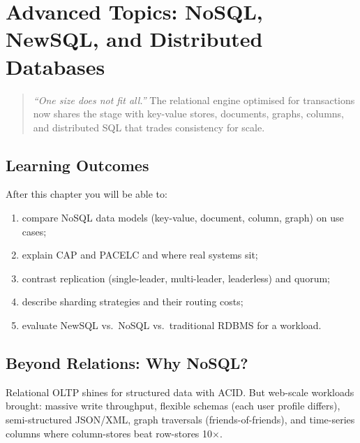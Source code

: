 \chapter{Advanced Topics: NoSQL, NewSQL, and Distributed Databases}
\label{ch:advanced}

\begin{quote}
\emph{``One size does not fit all.''} The relational engine optimised for transactions now shares the stage with key-value stores, documents, graphs, columns, and distributed SQL that trades consistency for scale.
\end{quote}

\noindent{}
\vspace{0.4em}

\section*{Learning Outcomes}
After this chapter you will be able to:
\begin{enumerate}[label=(L\arabic*)]
    \item compare NoSQL data models (key-value, document, column, graph) on use cases;
    \item explain CAP and PACELC and where real systems sit;
    \item contrast replication (single-leader, multi-leader, leaderless) and quorum;
    \item describe sharding strategies and their routing costs;
    \item evaluate NewSQL vs.\ NoSQL vs.\ traditional RDBMS for a workload.
\end{enumerate}

\section{Beyond Relations: Why NoSQL?}
\label{sec:why-nosql}

Relational OLTP shines for structured data with ACID. But web-scale workloads brought: massive write throughput, flexible schemas (each user profile differs), semi-structured JSON/XML, graph traversals (friends-of-friends), and time-series columns where column-stores beat row-stores 10$\times$.

